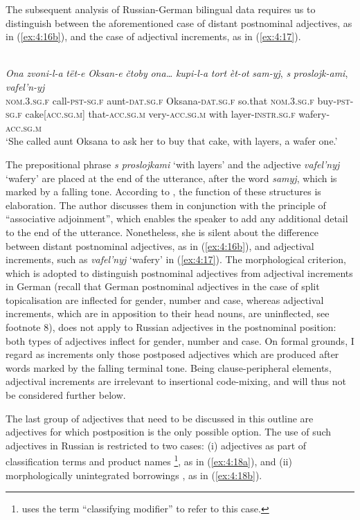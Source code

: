 The subsequent analysis of Russian-German bilingual data requires us to distinguish between the aforementioned case of distant postnominal adjectives, as in (\ref{ex:4:16b}), and the case of adjectival increments, as in (\ref{ex:4:17}).

\ea
\label{ex:4:17}
\citep[155]{zemskaja}\\
\gll \textit{Ona} \textit{zvoni-l-a} \textit{tët-e} \textit{Oksan-e}  \textit{čtoby} \textit{ona\dots} \textit{kupi-l-a} \textit{tort} \textit{èt-ot} \textit{sam-yj}, \textit{s} \textit{proslojk-ami}, \textit{vafel'n-yj}\\
	\textsc{nom.3.sg.f} call-\textsc{pst-sg.f} aunt-\textsc{dat.sg.f} Oksana-\textsc{dat.sg.f} so.that \textsc{nom.3.sg.f} buy-\textsc{pst-sg.f} cake[\textsc{acc.sg.m}] that-\textsc{acc.sg.m} very-\textsc{acc.sg.m} with layer-\textsc{instr.sg.f} wafery-\textsc{acc.sg.m}\\
\glt `She called aunt Oksana to ask her to buy that cake, with layers, a wafer one.'
\z

\noindent The prepositional phrase \textit{s proslojkami} `with layers' and the adjective \textit{vafel'nyj} `wafery' are placed at the end of the utterance, after the word \textit{samyj}, which is marked by a falling tone. According to \citet[155--156]{zemskaja}, the function of these structures is elaboration. The author discusses them in conjunction with the principle of ``associative adjoinment'', which enables the speaker to add any additional detail to the end of the utterance. Nonetheless, she is silent about the difference between distant postnominal adjectives, as in (\ref{ex:4:16b}), and adjectival increments, such as \textit{vafel'nyj} `wafery' in (\ref{ex:4:17}). The morphological criterion, which is adopted to distinguish postnominal adjectives from adjectival increments in German (recall that German postnominal adjectives in the case of split topicalisation are inflected for gender, number and case, whereas adjectival increments, which are in apposition to their head nouns, are uninflected, see footnote 8), does not apply to Russian adjectives in the postnominal position: both types of adjectives inflect for gender, number and case. On formal grounds, I regard as increments only those postposed adjectives which are produced after words marked by the falling terminal tone. Being clause-peripheral elements, adjectival increments are irrelevant to insertional code-mixing, and will thus not be considered further below. 

The last group of adjectives that need to be discussed in this outline are adjectives for which postposition is the only possible option. The use of such adjectives in Russian is restricted to two cases: (i) adjectives as part of classification terms and product names \citep[203]{rusgramm-tom2}\footnote{\citet{rijkhoff} uses the term ``classifying modifier'' to refer to this case.}, as in (\ref{ex:4:18a}), and (ii) morphologically unintegrated borrowings \citep[556]{rusgramm-tom1}, as in (\ref{ex:4:18b}). 

